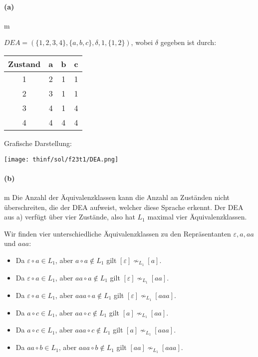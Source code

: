 
\paragraph{(a)}m
		 
	$DEA = (\{ 1,2,3,4\},\{ a,b,c\},\delta,1,\{ 1,2\})$, wobei $\delta$ gegeben ist durch:
		
	\begin{tabular}{c|ccc}
		Zustand & a & b & c \\
		\hline
		1       & 2 & 1 & 1 \\
		2       & 3 & 1 & 1 \\
		3       & 4 & 1 & 4 \\
		4       & 4 & 4 & 4 \\
	\end{tabular} 
		
	Grafische Darstellung:
	\begin{center}
		\texttt{[image: thinf/sol/f23t1/DEA.png]}
	\end{center}	
			
\paragraph{(b)}m
	Die Anzahl der Äquivalenzklassen kann die Anzahl an Zuständen nicht überschreiten, die der DEA aufweist, welcher diese Sprache erkennt. Der DEA aus a) verfügt über vier Zustände, also hat $L_1$ maximal vier Äquivalenzklassen.

	Wir finden vier unterschiedliche Äquivalenzklassen zu den Repräsentanten $\varepsilon, a, aa$ und $aaa$:
	\begin{itemize}
		\item Da $\varepsilon \circ a \in L_1$, aber $a \circ a \notin L_1$ gilt $[\varepsilon]\nsim_{L_1}[a]$.
		\item Da $\varepsilon \circ a \in L_1$, aber $aa \circ a \notin L_1$ gilt $[\varepsilon]\nsim_{L_1}[aa]$.
		\item Da $\varepsilon \circ a \in L_1$, aber $aaa \circ a \notin L_1$ gilt $[\varepsilon]\nsim_{L_1}[aaa]$.
		\item Da $a \circ c \in L_1$, aber $aa \circ c \notin L_1$ gilt $[a]\nsim_{L_1}[aa]$.
		\item Da $a \circ c \in L_1$, aber $aaa \circ c \notin L_1$ gilt $[a]\nsim_{L_1}[aaa]$.
		\item Da $aa \circ b \in L_1$, aber $aaa \circ b \notin L_1$ gilt $[aa]\nsim_{L_1}[aaa]$.
	\end{itemize}
	
